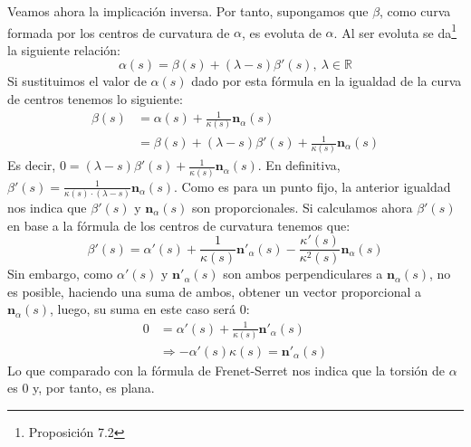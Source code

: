 Veamos ahora la implicación inversa. Por tanto, supongamos que $\beta$, como curva formada por los centros de curvatura de $\alpha$, es
evoluta de $\alpha$. Al ser evoluta se da\footnote{Proposición
7.2\cite{sanjurjo}} la siguiente relación:
\[
\alpha\left( s \right) = \beta\left( s \right) + \left( \lambda - s \right)
\beta'\left( s \right),\ \lambda \in \mathbb{R}
\]
Si sustituimos el valor de $\alpha\left( s \right)$ dado por esta fórmula en la
igualdad de la curva de centros tenemos lo siguiente:
\begin{align*}
    \beta\left( s \right) &= \alpha\left( s \right) + \frac{1}{\kappa\left( s
    \right)} \mathbf{n}_{\alpha}\left( s \right)\\
    &= \beta\left( s \right) + \left( \lambda - s \right) \beta'\left( s
    \right) + \frac{1}{\kappa\left( s \right)} \mathbf{n}_{\alpha}\left( s \right)
\end{align*}
Es decir, $0 = \left( \lambda - s \right)\beta'\left( s \right) +
\frac{1}{\kappa\left( s \right)} \mathbf{n}_{\alpha}\left( s \right)$. En
definitiva, $\beta'\left( s \right) = \frac{1}{\kappa\left( s \right) \cdot
\left( \lambda - s \right)} \mathbf{n}_{\alpha}\left( s \right)$. Como es para
un punto fijo, la anterior igualdad nos indica que $\beta'\left( s \right)$ y
$\mathbf{n}_{\alpha}\left( s \right)$ son proporcionales. %
Si calculamos ahora $\beta'\left( s \right)$ en base a la fórmula de los centros de curvatura
tenemos que:
\[
\beta'\left( s \right) = \alpha'\left( s \right) + \frac{1}{\kappa\left( s
\right)} \mathbf{n}'_{\alpha}\left( s \right) - \frac{\kappa'\left( s
\right)}{\kappa^2\left( s \right)} \mathbf{n}_{\alpha}\left( s \right)
\]
Sin embargo, como $\alpha'\left( s \right)$ y $\mathbf{n}'_{\alpha}\left( s \right)$ son ambos perpendiculares a
$\mathbf{n}_{\alpha}\left( s \right)$, no es posible, haciendo una suma de ambos, obtener un
vector proporcional a $\mathbf{n}_{\alpha}\left( s \right)$, luego, su suma en este caso será
$0$:
\begin{align*}
    0 &= \alpha'\left( s \right) + \frac{1}{\kappa\left( s
\right)}\mathbf{n}'_{\alpha}\left( s \right)\\
      &\Rightarrow -\alpha'\left( s \right) \kappa\left( s \right) =
      \mathbf{n}'_{\alpha}\left( s \right)
\end{align*}
Lo que comparado con la fórmula de Frenet-Serret nos indica que la torsión de
$\alpha$ es $0$ y, por tanto, es plana.
